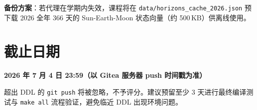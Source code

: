 \documentclass[11pt,a4paper]{ctexart}
\begin{document}
\textbf{备份方案}：若代理在学期内失效，课程将在 \texttt{data/horizons\_cache\_2026.json} 预下载 2026 全年 366 天的 Sun-Earth-Moon 状态向量（约 500\,KB）供离线使用。

\section{截止日期}

\begin{center}
\Large\bfseries\color{warn}
2026 年 7 月 4 日 23:59（以 Gitea 服务器 push 时间戳为准）
\end{center}

超出 DDL 的 \texttt{git push} 将被忽略，不予评分。建议预留至少 3 天进行最终编译测试与 \texttt{make all} 流程验证，避免临近 DDL 出现环境问题。
\end{document}

